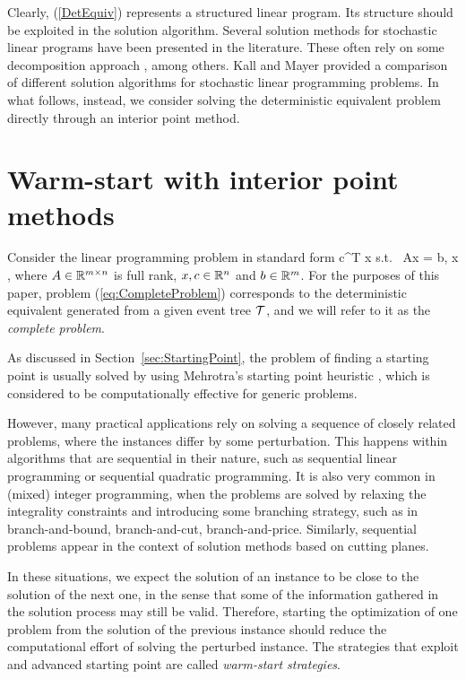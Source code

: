 Clearly, (\ref{DetEquiv}) represents a structured linear program. Its 
structure should be exploited in the solution algorithm.
Several solution methods for stochastic linear programs have been 
presented in the literature. These often rely on some decomposition
approach \cite{Birge85,MulveyRuszczynski,LinderothWright03}, among others.
Kall and Mayer \cite{KallMayer} provided a comparison of different
solution algorithms for stochastic linear programming problems.
In what follows, instead, we consider solving the deterministic equivalent
problem directly through an interior point method.

%
%
\section{Warm-start with interior point methods}
\label{sec:WarmStart}

Consider the linear programming problem in standard form
\be  \label{eq:CompleteProblem}
\min\;  c^T x \;\quad \mbox{s.t. }\; Ax = b, \;\; x ,
\ee
where $A \in \mathbb{R}^{m \times n}$ is full rank, 
$x, c \in \mathbb{R}^{n}$ and $b \in \mathbb{R}^{m}$. 
For the purposes of this paper, problem (\ref{eq:CompleteProblem})
corresponds to the deterministic equivalent generated from a
given event tree $\mathcal{T}$, and we will refer to it as the 
{\em complete problem}.

As discussed in Section~\ref{sec:StartingPoint}, the problem of 
finding a starting point is usually solved by using 
Mehrotra's starting point heuristic \cite{Mehrotra92}, which is 
considered to be computationally effective for generic problems.

However, many practical applications rely on solving a sequence 
of closely related problems, where the instances differ by some 
perturbation. This happens within algorithms that are sequential 
in their nature, such as sequential linear programming or
sequential quadratic programming.
It is also very common in (mixed) integer programming, when the
problems are solved by relaxing the integrality constraints and
introducing some branching strategy, such as in branch-and-bound,
branch-and-cut, branch-and-price.
Similarly, sequential problems appear in the context of solution 
methods based on cutting planes.

In these situations, we expect the solution of an instance to be 
close to the solution of the next one, in the sense that some of
the information gathered in the solution process may still be valid. 
Therefore, starting the 
optimization of one problem from the solution of the previous instance
should reduce the computational effort of solving the perturbed instance.
The strategies that exploit and advanced starting point are called
{\em warm-start strategies}.

